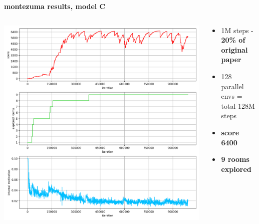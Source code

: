 \documentclass[xcolor=dvipsnames]{beamer}
\begin{document}
\begin{frame}{\bf montezuma results, model C}

\begin{columns}

    \begin{column}{0.5\textwidth}
      \includegraphics[scale=0.25]{../results/ppo_rnd_d_0.png}
    \end{column}

    \begin{column}{0.5\textwidth}
      \begin{itemize}
        \item 1M  steps - {\bf 20\% of original paper}
        \item 128 parallel envs = total 128M steps
        \item {\bf score 6400}
        \item {\bf 9 rooms explored}
      \end{itemize}
    \end{column}


\end{columns}


\end{frame}
\end{document}
